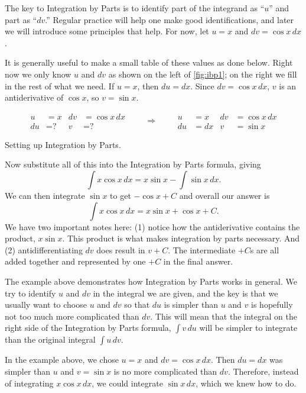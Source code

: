 {The key to Integration by Parts is to identify part of the integrand as ``$u$'' and part as ``$dv$.'' Regular practice will help one make good identifications, and later we will introduce some principles that help. For now, let  $u=x$ and $dv=\cos{x}\,dx$.

It is generally useful to make a small table of these values as done below. Right now we only know $u$ and $dv$ as shown on the left of \autoref{fig:ibp1}; on the right we fill in the rest of what we need. If $u = x$, then $du = dx$. Since $dv = \cos x\, dx$, $v$ is an antiderivative of $\cos x$, so $v = \sin x$.

\begin{lxfigure}
\[
\begin{aligned}
u&= x & dv&=\cos x\, dx\\
du&= \text{?} & v&=\text{?}
\end{aligned}
\qquad\Rightarrow\qquad
\begin{aligned}
u&= x & dv&=\cos x\, dx\\
du&= dx & v&=\sin x
\end{aligned}
\]
\caption{Setting up Integration by Parts.}\label{fig:ibp1}
\end{lxfigure}

Now substitute all of this into the Integration by Parts formula, giving
$$\int x\cos x\,dx = x\sin x - \int \sin x \,dx.$$
We can then integrate $\sin x$ to get $-\cos x + C$ and overall our answer is
$$\int x\cos x\, dx = x\sin x + \cos x + C.$$
We have two important notes here: (1) notice how the antiderivative contains the product, $x\sin x$. This product is what makes integration by parts necessary. And (2) antidifferentiating $dv$ does result in $v+C$. The intermediate $+C$s are all added together and represented by one $+C$ in the final answer.}

The example above demonstrates how Integration by Parts works in general.  We try to identify $u$ and $dv$ in the integral we are given, and the key is that we usually want to choose $u$ and $dv$ so that $du$ is simpler than $u$ and $v$ is hopefully not too much more complicated than $dv$.  This will mean that the integral on the right side of the Integration by Parts formula, $\int v\,du$ will be simpler to integrate than the original integral $\int u\,dv$.

In the example above, we chose $u=x$ and $dv=\cos x\,dx$.  Then $du=dx$ was simpler than $u$ and $v=\sin x$ is no more complicated than $dv$.  Therefore, instead of integrating $x\cos x \,dx$, we could integrate $\sin x\,dx$, which we knew how to do.

